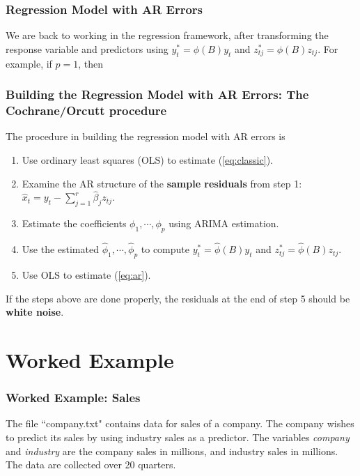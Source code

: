 \documentclass[%
xcolor=pdftex]{beamer}
\begin{document}
\begin{frame}
\frametitle{Regression Model with AR Errors}

We are back to working in the regression framework, after transforming the response variable and predictors using $y_t^* = \phi(B) y_t$ and $z_{tj}^* = \phi(B) z_{tj}$. For example, if $p=1$, then

\vspace{40mm}

\end{frame}




\begin{frame}
\frametitle{Building the Regression Model with AR Errors: The Cochrane/Orcutt procedure}

The procedure in building the regression model with AR errors is

\begin{enumerate}
\item Use ordinary least squares (OLS) to estimate (\ref{eq:classic}).
\item Examine the AR structure of the \textbf{sample residuals} from step 1: $\hat{x}_t = y_t - \sum_{j=1}^r \hat{\beta}_j z_{tj}$.
\item Estimate the coefficients $\phi_1, \cdots, \phi_p$ using ARIMA estimation.
\item Use the estimated $\hat{\phi}_1, \cdots, \hat{\phi}_p$ to compute $y_t^* = \hat{\phi}(B)y_t$ and $z_{tj}^* = \hat{\phi}(B)z_{tj}$.
\item Use OLS to estimate (\ref{eq:ar}).
\end{enumerate}

If the steps above are done properly, the residuals at the end of step 5 should be \textbf{white noise}.


\end{frame}

\section{Worked Example}
\frame{\tableofcontents[currentsection]}

\begin{frame}
\frametitle{Worked Example: Sales}

The file ``company.txt" contains data for sales of a company. The company wishes to predict its sales by using industry sales as a predictor. The variables \textit{company} and \textit{industry} are the company sales in millions, and industry sales in millions. The data are collected over 20 quarters.

\end{frame}
\end{document}
